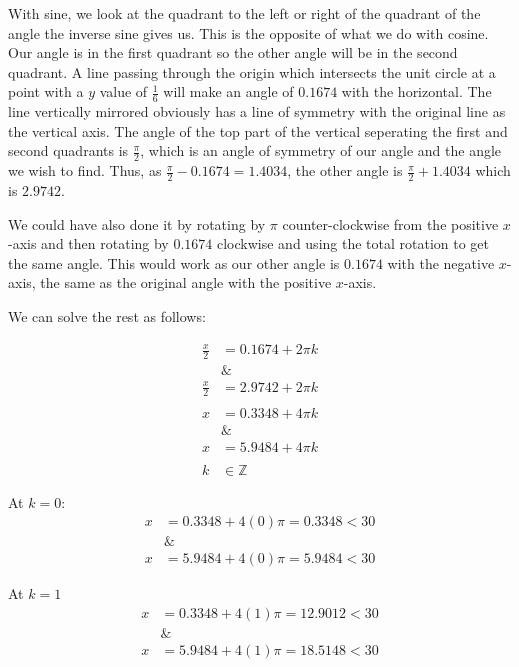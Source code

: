\documentclass[12pt]{article}
\theoremstyle{definition}
\begin{document}
With sine, we look at the quadrant to the left or right of the quadrant of the angle the inverse sine gives us.
This is the opposite of what we do with cosine.
Our angle is in the first quadrant so the other angle will be in the second quadrant.
A line passing through the origin which intersects the unit circle at a point with a $y$ value of $\frac{1}{6}$ will make an angle of $0.1674$ with the horizontal.
The line vertically mirrored obviously has a line of symmetry with the original line as the vertical axis.
The angle of the top part of the vertical seperating the first and second quadrants is $\frac{\pi}{2}$, which is an angle of symmetry of our angle and the angle we wish to find.
Thus, as $\frac{\pi}{2}-0.1674=1.4034$, the other angle is $\frac{\pi}{2}+1.4034$ which is $2.9742$.

We could have also done it by rotating by $\pi$ counter-clockwise from the positive $x$-axis and then rotating by $0.1674$ clockwise and using the total rotation to get the same angle.
This would work as our other angle is $0.1674$ with the negative $x$-axis, the same as the original angle with the positive $x$-axis.

We can solve the rest as follows:

\begin{align}
    \frac{x}{2} & = 0.1674 + 2\pi k \\
    \nonumber   & \&                \\
    \frac{x}{2} & = 2.9742 + 2\pi k \\
    \nonumber                       \\
    x           & = 0.3348 + 4\pi k \\
    \nonumber   & \&                \\
    x           & = 5.9484 + 4\pi k \\
    \nonumber                       \\
    k           & \in \mathbb{Z}
\end{align}

At $k=0$:
\begin{align}
    x         & = 0.3348 + 4(0)\pi = 0.3348 < 30 \\
    \nonumber & \&                               \\
    x         & = 5.9484 + 4(0)\pi = 5.9484 < 30
\end{align}

At $k=1$
\begin{align}
    x         & = 0.3348 + 4(1)\pi = 12.9012 < 30 \\
    \nonumber & \&                                \\
    x         & = 5.9484 + 4(1)\pi = 18.5148 < 30
\end{align}
\end{document}
